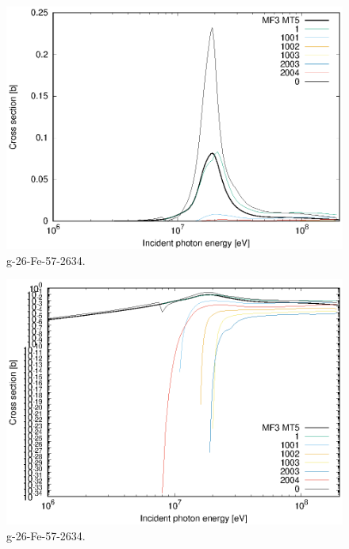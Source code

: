 \begin{figure}
 \includegraphics[width=\linewidth]{eps/g_26-Fe-57_2634.eps}
  \caption{g-26-Fe-57-2634.}
\end{figure}
\begin{figure}
 \includegraphics[width=\linewidth]{eps-log/g_26-Fe-57_2634.eps}
 \caption{g-26-Fe-57-2634.}
\end{figure}
\newpage \clearpage

